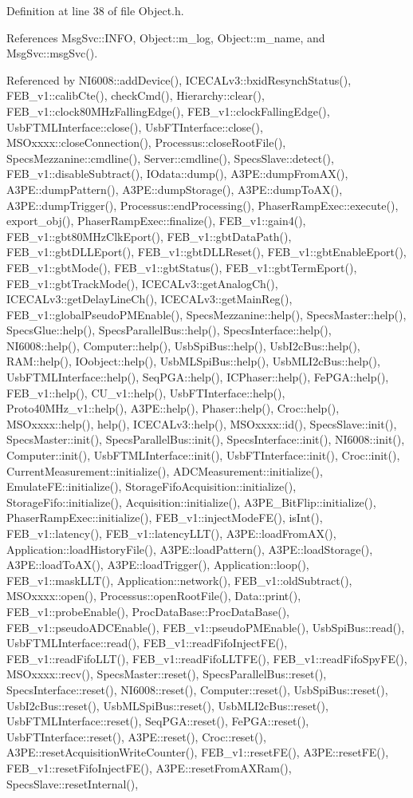 Definition at line 38 of file Object.h.

References MsgSvc::INFO, Object::m\_\-log, Object::m\_\-name, and MsgSvc::msgSvc().

Referenced by NI6008::addDevice(), ICECALv3::bxidResynchStatus(), FEB\_\-v1::calibCte(), checkCmd(), Hierarchy::clear(), FEB\_\-v1::clock80MHzFallingEdge(), FEB\_\-v1::clockFallingEdge(), UsbFTMLInterface::close(), UsbFTInterface::close(), MSOxxxx::closeConnection(), Processus::closeRootFile(), SpecsMezzanine::cmdline(), Server::cmdline(), SpecsSlave::detect(), FEB\_\-v1::disableSubtract(), IOdata::dump(), A3PE::dumpFromAX(), A3PE::dumpPattern(), A3PE::dumpStorage(), A3PE::dumpToAX(), A3PE::dumpTrigger(), Processus::endProcessing(), PhaserRampExec::execute(), export\_\-obj(), PhaserRampExec::finalize(), FEB\_\-v1::gain4(), FEB\_\-v1::gbt80MHzClkEport(), FEB\_\-v1::gbtDataPath(), FEB\_\-v1::gbtDLLEport(), FEB\_\-v1::gbtDLLReset(), FEB\_\-v1::gbtEnableEport(), FEB\_\-v1::gbtMode(), FEB\_\-v1::gbtStatus(), FEB\_\-v1::gbtTermEport(), FEB\_\-v1::gbtTrackMode(), ICECALv3::getAnalogCh(), ICECALv3::getDelayLineCh(), ICECALv3::getMainReg(), FEB\_\-v1::globalPseudoPMEnable(), SpecsMezzanine::help(), SpecsMaster::help(), SpecsGlue::help(), SpecsParallelBus::help(), SpecsInterface::help(), NI6008::help(), Computer::help(), UsbSpiBus::help(), UsbI2cBus::help(), RAM::help(), IOobject::help(), UsbMLSpiBus::help(), UsbMLI2cBus::help(), UsbFTMLInterface::help(), SeqPGA::help(), ICPhaser::help(), FePGA::help(), FEB\_\-v1::help(), CU\_\-v1::help(), UsbFTInterface::help(), Proto40MHz\_\-v1::help(), A3PE::help(), Phaser::help(), Croc::help(), MSOxxxx::help(), help(), ICECALv3::help(), MSOxxxx::id(), SpecsSlave::init(), SpecsMaster::init(), SpecsParallelBus::init(), SpecsInterface::init(), NI6008::init(), Computer::init(), UsbFTMLInterface::init(), UsbFTInterface::init(), Croc::init(), CurrentMeasurement::initialize(), ADCMeasurement::initialize(), EmulateFE::initialize(), StorageFifoAcquisition::initialize(), StorageFifo::initialize(), Acquisition::initialize(), A3PE\_\-BitFlip::initialize(), PhaserRampExec::initialize(), FEB\_\-v1::injectModeFE(), isInt(), FEB\_\-v1::latency(), FEB\_\-v1::latencyLLT(), A3PE::loadFromAX(), Application::loadHistoryFile(), A3PE::loadPattern(), A3PE::loadStorage(), A3PE::loadToAX(), A3PE::loadTrigger(), Application::loop(), FEB\_\-v1::maskLLT(), Application::network(), FEB\_\-v1::oldSubtract(), MSOxxxx::open(), Processus::openRootFile(), Data::print(), FEB\_\-v1::probeEnable(), ProcDataBase::ProcDataBase(), FEB\_\-v1::pseudoADCEnable(), FEB\_\-v1::pseudoPMEnable(), UsbSpiBus::read(), UsbFTMLInterface::read(), FEB\_\-v1::readFifoInjectFE(), FEB\_\-v1::readFifoLLT(), FEB\_\-v1::readFifoLLTFE(), FEB\_\-v1::readFifoSpyFE(), MSOxxxx::recv(), SpecsMaster::reset(), SpecsParallelBus::reset(), SpecsInterface::reset(), NI6008::reset(), Computer::reset(), UsbSpiBus::reset(), UsbI2cBus::reset(), UsbMLSpiBus::reset(), UsbMLI2cBus::reset(), UsbFTMLInterface::reset(), SeqPGA::reset(), FePGA::reset(), UsbFTInterface::reset(), A3PE::reset(), Croc::reset(), A3PE::resetAcquisitionWriteCounter(), FEB\_\-v1::resetFE(), A3PE::resetFE(), FEB\_\-v1::resetFifoInjectFE(), A3PE::resetFromAXRam(), SpecsSlave::resetInternal(), 